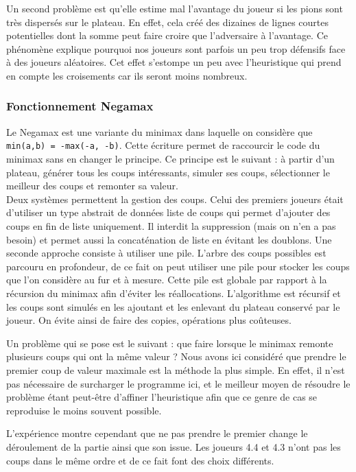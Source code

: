 \documentclass[a4paper,11pt]{article}
\begin{document}
Un second problème est qu'elle estime mal l'avantage du joueur si les pions sont très dispersés sur le plateau. En effet, cela créé des dizaines de lignes courtes potentielles dont la somme peut faire croire que l'adversaire à l'avantage. Ce phénomène explique pourquoi nos joueurs sont parfois un peu trop défensifs face à des joueurs aléatoires. Cet effet s'estompe un peu avec l'heuristique qui prend en compte les croisements car ils seront moins nombreux.

\subsubsection{Fonctionnement Negamax}

Le Negamax est une variante du minimax dans laquelle on considère que \verb+min(a,b) = -max(-a, -b)+. Cette écriture permet de raccourcir le code du minimax sans en changer le principe. Ce principe est le suivant : à partir d'un plateau, générer tous les coups intéressants, simuler ses coups, sélectionner le meilleur des coups et remonter sa valeur. \\

Deux systèmes permettent la gestion des coups. Celui des premiers joueurs était d'utiliser un type abstrait de données liste de coups qui permet d'ajouter des coups en fin de liste uniquement. Il interdit la suppression (mais on n'en a pas besoin) et permet aussi la concaténation de liste en évitant les doublons. Une seconde approche consiste à utiliser une pile. L'arbre des coups possibles est parcouru en profondeur, de ce fait on peut utiliser une pile pour stocker les coups que l'on considère au fur et à mesure. Cette pile est globale par rapport à la récursion du minimax afin d'éviter les réallocations. L'algorithme est récursif et les coups sont simulés en les ajoutant et les enlevant du plateau conservé par le joueur. On évite ainsi de faire des copies, opérations plus coûteuses.

Un problème qui se pose est le suivant : que faire lorsque le minimax remonte plusieurs coups qui ont la même valeur ? Nous avons ici considéré que prendre le premier coup de valeur maximale est la méthode la plus simple. En effet, il n'est pas nécessaire de surcharger le programme ici, et le meilleur moyen de résoudre le problème étant peut-être d'affiner l'heuristique afin que ce genre de cas se reproduise le moins souvent possible.

L'expérience montre cependant que ne pas prendre le premier change le déroulement de la partie ainsi que son issue. Les joueurs 4.4 et 4.3 n'ont pas les coups dans le même ordre et de ce fait font des choix différents.
\end{document}
